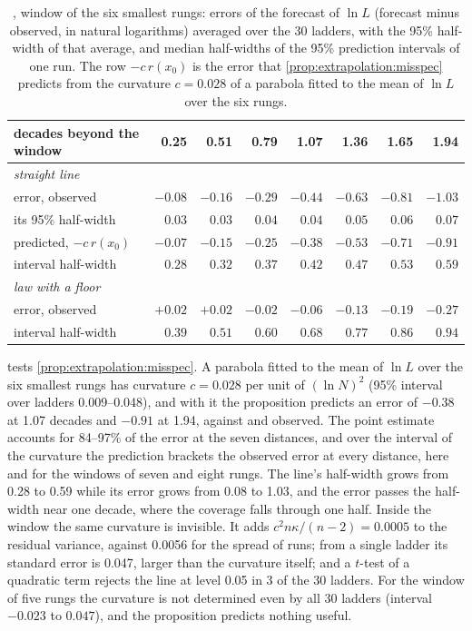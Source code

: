 \begin{refsection}
\begin{table}[t]
\centering\small\setlength{\tabcolsep}{3pt}
\begin{tabular}{l*{7}{r}}
\toprule
decades beyond the window & 0.25 & 0.51 & 0.79 & 1.07 & 1.36 & 1.65 & 1.94\\
\midrule
\emph{straight line}\\
\quad error, observed & $-0.08$ & $-0.16$ & $-0.29$ & $-0.44$ & $-0.63$ & $-0.81$ & $-1.03$\\
\quad its 95\% half-width & $0.03$ & $0.03$ & $0.04$ & $0.04$ & $0.05$ & $0.06$ & $0.07$\\
\quad predicted, $-c\,r(x_0)$ & $-0.07$ & $-0.15$ & $-0.25$ & $-0.38$ & $-0.53$ & $-0.71$ & $-0.91$\\
\quad interval half-width & $0.28$ & $0.32$ & $0.37$ & $0.42$ & $0.47$ & $0.53$ & $0.59$\\
\emph{law with a floor}\\
\quad error, observed & $+0.02$ & $+0.02$ & $-0.02$ & $-0.06$ & $-0.13$ & $-0.19$ & $-0.27$\\
\quad interval half-width & $0.39$ & $0.51$ & $0.60$ & $0.68$ & $0.77$ & $0.86$ & $0.94$\\
\bottomrule
\end{tabular}
\caption{, window of the six smallest rungs: errors of the forecast of $\ln L$ (forecast minus observed, in natural logarithms) averaged over the 30 ladders, with the 95\% half-width of that average, and median half-widths of the 95\% prediction intervals of one run. The row $-c\,r(x_0)$ is the error that \cref{prop:extrapolation:misspec} predicts from the curvature $c=0.028$ of a parabola fitted to the mean of $\ln L$ over the six rungs.}
\label{tab:extrapolation:bias}
\end{table}

 tests \cref{prop:extrapolation:misspec}. A parabola fitted to the mean of $\ln L$ over the six smallest rungs has curvature $c=0.028$ per unit of $(\ln N)^2$ (95\% interval over ladders 0.009--0.048), and with it the proposition predicts an error of $-0.38$ at 1.07 decades and $-0.91$ at 1.94, against  and  observed. The point estimate accounts for 84--97\% of the error at the seven distances, and over the interval of the curvature the prediction brackets the observed error at every distance, here and for the windows of seven and eight rungs. The line's half-width grows from 0.28 to 0.59 while its error grows from 0.08 to 1.03, and the error passes the half-width near one decade, where the coverage falls through one half. Inside the window the same curvature is invisible. It adds $c^2n\kappa/(n-2)=0.0005$ to the residual variance, against 0.0056 for the spread of runs; from a single ladder its standard error is 0.047, larger than the curvature itself; and a $t$-test of a quadratic term rejects the line at level 0.05 in 3 of the 30 ladders. For the window of five rungs the curvature is not determined even by all 30 ladders (interval $-0.023$ to $0.047$), and the proposition predicts nothing useful.


\end{refsection}
